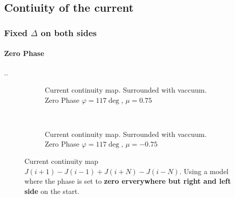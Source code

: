 \documentclass[../main.tex]{subfiles}
\begin{document}
\subsection{Contiuity of the current}
\subsubsection{Fixed $\Delta$ on both sides}
\paragraph{Zero Phase}..

\begin{figure}[H]
    \begin{subfigure}{0.4\textwidth}
        \centering
        \hspace{-4cm} %
        
        \caption{Current continuity map. Surrounded with vaccuum. Zero Phase $\varphi = 117\deg$, $\mu = 0.75$}
        \label{fig:first}
    \end{subfigure}    \\
    \begin{subfigure}{0.4\textwidth}
        \centering
        \hspace{-4cm} %
        
        \caption{Current continuity map. Surrounded with vaccuum. Zero Phase $\varphi = 117\deg$, $\mu = -0.75$}
        \label{fig:first}
    \end{subfigure}    
    \caption{ Current continuity map $J(i+1) - J(i-1) + J(i+N)- J(i-N)$. Using a model where the phase is set to \textbf{zero erverywhere but right and left side} on the start.}
\end{figure}
\end{document}
